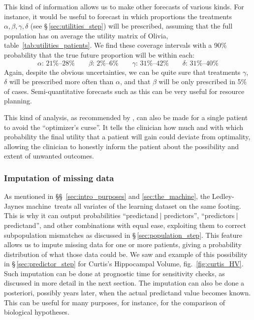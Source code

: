 \documentclass[utf8]{FrontiersinHarvard_mod} %
\newcommand*{\sect}{\S}%
\newcommand*{\sects}{\S\S}%
\newcommand*{\fig}{fig.}%
\renewcommand*{\|}[1][]{\nonscript\:#1\vert\nonscript\:\mathopen{}}
\newcommand*{\ljm}{Ledley-Jaynes machine}
\begin{document}
This kind of information allows us to make other forecasts of various kinds. For instance, it would be useful to forecast in which proportions the treatments $\alpha,\beta,\gamma,\delta$ (see \sect\,\ref{sec:utilities_step}) will be prescribed, assuming that the full population has on average the utility matrix of Olivia, table~\ref{tab:utilities_patients}. We find these coverage intervals with a 90\% probability that the true future proportion will be within each:
\begin{equation}
  \label{eq:ranges_future_treatments}
  \alpha\text{: 21\%--28\%}\qquad
  \beta\text{: 2\%--6\%}\qquad
  \gamma\text{: 31\%--42\%}\qquad
  \delta\text{: 31\%--40\%}
\end{equation}
Again, despite the obvious uncertainties, we can be quite sure that treatments $\gamma$, $\delta$ will be prescribed more often than $\alpha$, and that $\beta$ will be only prescribed in 5\% of cases. Semi-quantitative forecasts such as this can be very useful for resource planning.

This kind of analysis, as recommended by \citet{smithetal2006}, can also be made for a single patient to avoid the \enquote{optimizer's curse}. It tells the clinician how much and with which probability the final utility that a patient will gain could deviate from optimality, allowing the clinician to honestly inform the patient about the possibility and extent of unwanted outcomes.

\subsubsection{Imputation of missing data}
\label{sec:missing_data}

As mentioned in \sects~\ref{sec:intro_purposes} and \ref{sec:the_machine}, the \ljm\ treats all variates of the learning dataset on the same footing. This is why it can output probabilities \enquote{predictand$\|$predictors}, \enquote{predictors$\|$predictand}, and other combinations with equal ease, exploiting them to correct subpopulation mismatches as discussed in \sect\,\ref{sec:population_step}. This feature allows us to impute missing data for one or more patients, giving a probability distribution of what those data could be. We saw and example of this possibility in \sect\,\ref{sec:predictor_step} for Curtis's Hippocampal Volume, \fig~\ref{fig:curtis_HV}. Such imputation can be done at prognostic time for sensitivity checks, as discussed in more detail in the next section. The imputation can also be done a posteriori, possibly years later, when the actual predictand value becomes known. This can be useful for many purposes, for instance, for the comparison of biological hypotheses.
\end{document}
